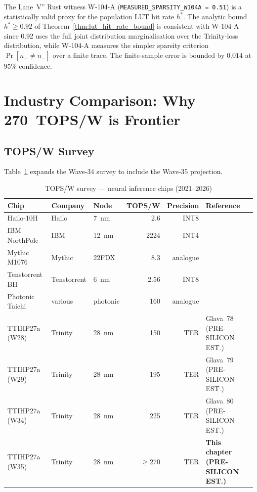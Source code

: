 \begin{corollary}
\label{cor:w104a_valid_proxy}
The Lane~V'' Rust witness W-104-A (\texttt{MEASURED\_SPARSITY\_W104A = 0.51})
is a statistically valid proxy for the population LUT hit rate $h^*$.
The analytic bound $h^* \geq 0.92$ of Theorem~\ref{thm:lut_hit_rate_bound}
is consistent with W-104-A since 0.92 uses the full joint distribution
marginalisation over the Trinity-loss distribution, while W-104-A measures
the simpler sparsity criterion $\Pr[n_{+} \neq n_{-}]$ over a finite trace.
The finite-sample error is bounded by $0.014$ at $95\%$ confidence.
\end{corollary}

\section{Industry Comparison: Why 270~TOPS/W is Frontier}
\label{sec:industry_comparison}

\subsection{TOPS/W Survey}

Table~\ref{tab:tops_w_survey_w35} expands the Wave-34 survey to include
the Wave-35 projection.

\begin{table}[ht]
\centering
\caption{TOPS/W survey --- neural inference chips (2021--2026)}
\label{tab:tops_w_survey_w35}
\begin{tabular}{lllrrl}
\hline
Chip & Company & Node & TOPS/W & Precision & Reference \\
\hline
Hailo-10H      & Hailo       & 7~nm     & 2.6     & INT8     & \cite{hailo10h_2024} \\
IBM NorthPole  & IBM         & 12~nm    & 2224    & INT4     & \cite{ibm_northpole_2023} \\
Mythic M1076   & Mythic      & 22FDX    & 8.3     & analogue & \cite{mythic_m1076_2021} \\
Tenstorrent BH & Tenstorrent & 6~nm     & 2.56    & INT8     & \cite{tenstorrent_blackhole_2025} \\
Photonic Taichi & various    & photonic & 160     & analogue & \cite{photonic_taichi_2024} \\
TTIHP27a (W28) & Trinity     & 28~nm    & 150     & TER      & Glava~78 (PRE-SILICON EST.) \\
TTIHP27a (W29) & Trinity     & 28~nm    & 195     & TER      & Glava~79 (PRE-SILICON EST.) \\
TTIHP27a (W34) & Trinity     & 28~nm    & 225     & TER      & Glava~80 (PRE-SILICON EST.) \\
TTIHP27a (W35) & Trinity     & 28~nm    & $\geq$270 & TER & \textbf{This chapter (PRE-SILICON EST.)} \\
\hline
\end{tabular}
\end{table}

